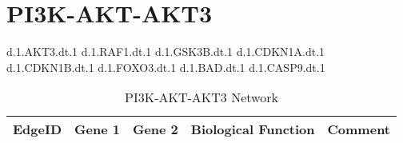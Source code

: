 
\section{PI3K-AKT-AKT3}

d.1.AKT3.dt.1 
d.1.RAF1.dt.1
d.1.GSK3B.dt.1
d.1.CDKN1A.dt.1
d.1.CDKN1B.dt.1 
d.1.FOXO3.dt.1 
d.1.BAD.dt.1 
d.1.CASP9.dt.1 

\begin{table}[H]
	\tiny
	\begin{tabular}{p{1cm}p{1cm}p{3cm}p{1cm}p{1cm}} 
		EdgeID & Gene 1 & Gene 2 & Biological Function & Comment \\
		\hline
    
    \end{tabular}
	\caption{PI3K-AKT-AKT3 Network}
	\label{tab:Table2}
\end{table}
